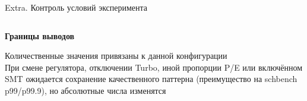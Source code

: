 \documentclass[aspectratio=169,11pt]{beamer}
\begin{document}
\begin{frame}{Extra. Контроль условий эксперимента}
\begin{columns}[T]
                \begin{shadowbox2}
                        \textbf{Границы выводов}

                        \scriptsize
                        Количественные значения привязаны к данной
                        конфигурации\\[0.15em]
                        При смене регулятора, отключении Turbo, иной
                        пропорции P/E или включённом SMT ожидается
                        сохранение качественного паттерна
                        (преимущество на schbench p99/p99.9), но
                        абсолютные числа изменятся
                \end{shadowbox2}
        \end{columns}
\end{frame}
\addtocounter{framenumber}{-1}
\end{document}
